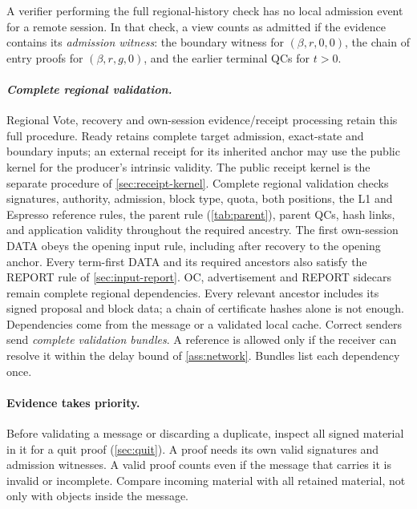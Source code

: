 \documentclass[11pt,a4paper]{article}
\newcommand{\defterm}[1]{\textcolor{rrBlue}{\textit{#1}}}
\begin{document}
A verifier performing the full regional-history check has no local
admission event for a remote session. In that check, a view counts as
admitted if the evidence contains
its \defterm{admission witness}: the boundary witness for $(\beta,r,0,0)$, the chain of
entry proofs for $(\beta,r,g,0)$, and the earlier terminal QCs for $t>0$.

\paragraph{\defterm{Complete regional validation.}}
Regional Vote, recovery and own-session evidence/receipt processing
retain this full procedure. Ready retains complete target admission,
exact-state and boundary inputs; an external receipt for its inherited
anchor may use the public kernel for the producer's intrinsic validity.
The public receipt kernel is the separate procedure of
\cref{sec:receipt-kernel}. Complete regional validation checks signatures, authority, admission, block type, quota,
both positions, the L1 and Espresso reference rules, the parent rule
(\cref{tab:parent}), parent QCs, hash links, and application validity
throughout the required ancestry. The first own-session DATA obeys the
opening input rule, including after recovery to the opening anchor.
Every term-first DATA and its required ancestors also satisfy the REPORT
rule of \cref{sec:input-report}. OC, advertisement and REPORT sidecars
remain complete regional dependencies.
Every relevant ancestor includes its
signed proposal and block data; a chain of certificate hashes alone is
not enough. Dependencies come from the message or a validated local
cache. Correct senders send \defterm{complete validation bundles}. A reference is
allowed only if the receiver can resolve it within the delay bound of
\cref{ass:network}. Bundles list each dependency once.

\paragraph{Evidence takes priority.}
Before validating a message or discarding a duplicate, inspect all signed
material in it for a quit proof (\cref{sec:quit}). A proof needs its own
valid signatures and admission witnesses. A valid proof counts even if
the message that carries it is invalid or incomplete. Compare incoming
material with all retained material, not only with objects inside the
message.
\end{document}
